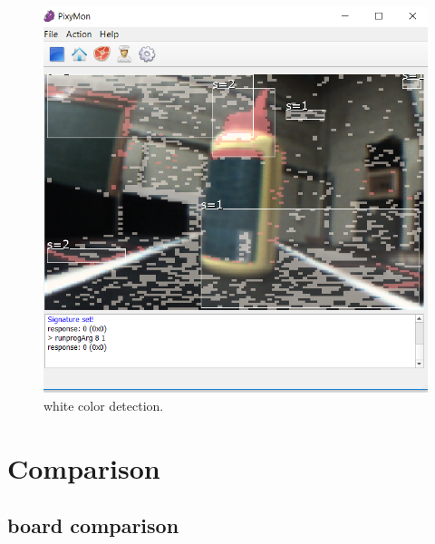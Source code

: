 \documentclass[english]{book_template} %
\begin{document}
\begin{figure}[H]
\center
\caption{white color detection.\label{fig:whitecolor}}
\includegraphics[scale=0.5]{./img/whitecolor}
\end{figure} 







\chapter{Comparison}
\section{board comparison}
\end{document}
